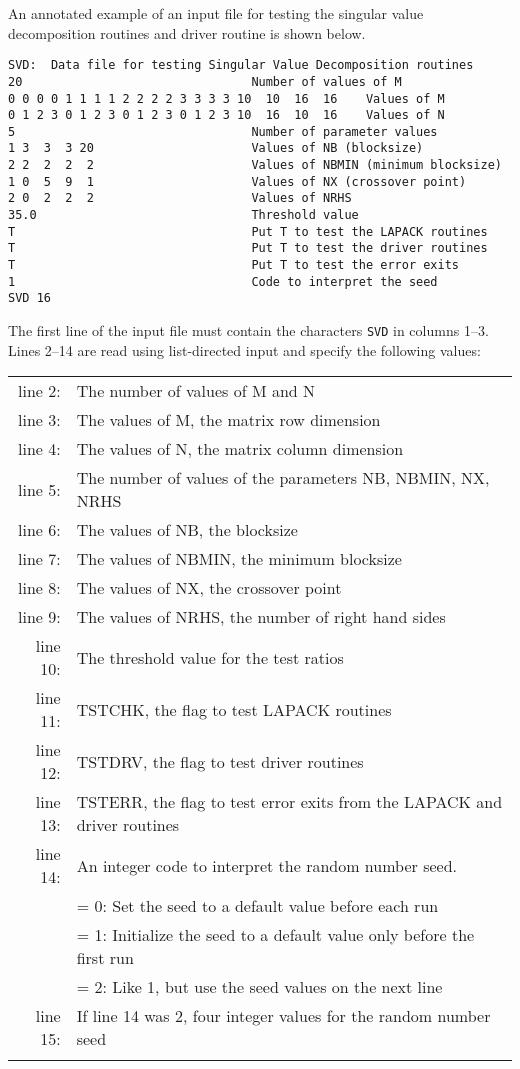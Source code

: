 \dent
An annotated example of an input file for testing the singular value
decomposition routines and driver routine is shown below.

\begin{verbatim}
SVD:  Data file for testing Singular Value Decomposition routines
20                                Number of values of M
0 0 0 0 1 1 1 1 2 2 2 2 3 3 3 3 10  10  16  16    Values of M
0 1 2 3 0 1 2 3 0 1 2 3 0 1 2 3 10  16  10  16    Values of N
5                                 Number of parameter values
1 3  3  3 20                      Values of NB (blocksize)
2 2  2  2  2                      Values of NBMIN (minimum blocksize)
1 0  5  9  1                      Values of NX (crossover point)
2 0  2  2  2                      Values of NRHS
35.0                              Threshold value
T                                 Put T to test the LAPACK routines
T                                 Put T to test the driver routines
T                                 Put T to test the error exits
1                                 Code to interpret the seed
SVD 16
\end{verbatim}

The first line of the input file
must contain the characters {\tt SVD} in columns 1--3.
Lines 2--14 are read using list-directed input and specify the following
values:

\begin{tabular}{r l}
\\
line 2: & The number of values of M and N \\
line 3: & The values of M, the matrix row dimension \\
line 4: & The values of N, the matrix column dimension \\
line 5: & The number of values of the parameters NB, NBMIN, NX, NRHS \\
line 6: & The values of NB, the blocksize \\
line 7: & The values of NBMIN, the minimum blocksize \\
line 8: & The values of NX, the crossover point \\
line 9: & The values of NRHS, the number of right hand sides \\
line 10:& The threshold value for the test ratios \\
line 11:& TSTCHK, the flag to test LAPACK routines \\
line 12:& TSTDRV, the flag to test driver routines \\
line 13:& TSTERR, the flag to test error exits from the LAPACK and
driver routines \\
line 14:& An integer code to interpret the random number seed. \\
        & = 0:  Set the seed to a default value before each run \\
        & = 1:  Initialize the seed to a default value only before the
first run
 \\
        & = 2:  Like 1, but use the seed values on the next line \\
line 15:& If line 14 was 2, four integer values for the random number
seed \\
        &
\end{tabular}

